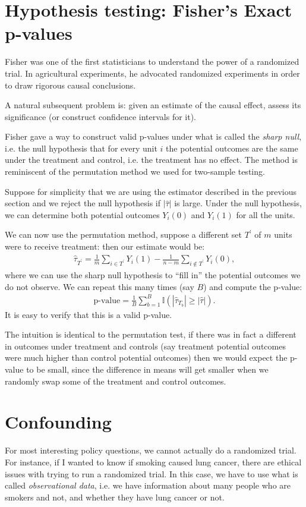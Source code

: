 \documentclass[twoside,12pt]{article}
\begin{document}
\section{Hypothesis testing: Fisher's Exact p-values}
Fisher was one of the first statisticians to understand the power of a randomized trial. In agricultural experiments, he advocated randomized experiments in order to draw rigorous causal conclusions. 

A natural subsequent problem is: given an estimate of the causal effect, assess its significance (or  construct confidence intervals for it).

Fisher gave a way to construct valid p-values under what is called the \emph{sharp null}, i.e. the null hypothesis that for every unit $i$ the potential outcomes are the same under the treatment and control, i.e. the treatment has no effect.  The method is reminiscent of the permutation method we used for two-sample testing.

Suppose for simplicity that we are using the estimator described in the previous section and we reject the null hypothesis if $|\widehat{\tau}|$ is large.
Under the null hypothesis, we can determine both potential outcomes $Y_i(0)$ and $Y_i(1)$ for all the units. 

We can now use the permutation method, suppose a different set $T^\prime$ of $m$ units were to receive treatment: then our estimate would be:
\begin{align*}
\widehat{\tau}_{T^\prime} = \frac{1}{m} \sum_{i \in T^\prime} Y_i(1) - \frac{1}{n - m} \sum_{i \notin T^\prime} Y_i(0),
\end{align*}
where we can use the sharp null hypothesis to ``fill in'' the potential outcomes we do not observe. We can repeat this many times (say $B$) and compute the p-value:
\begin{align*}
\text{p-value} = \frac{1}{B} \sum_{b = 1}^B \mathbb{I} (|\widehat{\tau}_{T_b}| \geq |\widehat{\tau}|).
\end{align*}
It is easy to verify that this is a valid p-value.

The intuition is identical to the permutation test, if there was in fact a different in outcomes under treatment and controls (say treatment potential outcomes were much higher than control potential outcomes) then we would expect the p-value to be small, since the difference in means will get smaller when we randomly swap some of the treatment and control outcomes.


\section{Confounding}
For most interesting policy questions, we cannot actually do a randomized trial. For instance, if I wanted to know if smoking caused lung cancer, there are ethical issues with trying to run a randomized trial. In this case, we have to use what is called \emph{observational data}, i.e. we have information about many people who are smokers and not, and whether they have lung cancer or not. 
\end{document}

